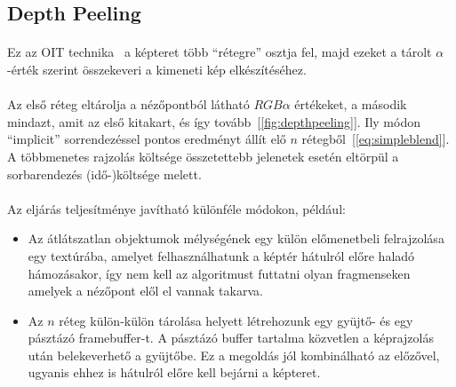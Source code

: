 \subsection{Depth Peeling}
\paragraph{}Ez az \ac{OIT} technika~\cite{Everitt01interactiveorder-independent} a képteret több ``rétegre'' osztja fel, majd ezeket a tárolt $\alpha$-érték szerint összekeveri a kimeneti kép elkészítéséhez.
\paragraph{}Az első réteg eltárolja a nézőpontból látható $RGB\alpha$ értékeket, a második mindazt, amit az első kitakart, és így tovább~[\ref{fig:depthpeeling}]. Ily módon ``implicit'' sorrendezéssel pontos eredményt állít elő $n$ rétegből~[\ref{eq:simpleblend}]. A többmenetes rajzolás költsége összetettebb jelenetek esetén eltörpül a sorbarendezés (idő-)költsége melett.
\paragraph{}Az eljárás teljesítménye javítható különféle módokon, például:
\begin{itemize}
	\label{list:depthpeelvariants}
	\item Az átlátszatlan objektumok mélységének egy külön előmenetbeli felrajzolása egy textúrába, amelyet felhasználhatunk a képtér hátulról előre haladó hámozásakor, így nem kell az algoritmust futtatni olyan fragmenseken amelyek a nézőpont elől el vannak takarva.
	\item Az $n$ réteg külön-külön tárolása helyett létrehozunk egy gyüjtő- és egy pásztázó framebuffer-t. A pásztázó buffer tartalma közvetlen a képrajzolás után belekeverhető a gyüjtőbe. Ez a megoldás jól kombinálható az előzővel, ugyanis ehhez is hátulról előre kell bejárni a képteret.
\end{itemize}


